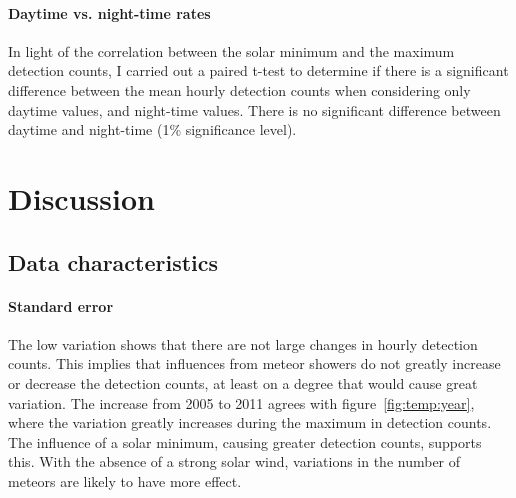 \paragraph{Daytime vs. night-time rates\\}
In light of the correlation between the solar minimum and the maximum detection counts, I carried out a paired t-test to determine if there is a significant difference between the mean hourly detection counts when considering only daytime values, and night-time values. There is no significant difference between daytime and night-time (1\% significance level).
\section{Discussion}
\subsection{Data characteristics}
\paragraph{Standard error\\}
The low variation shows that there are not large changes in hourly detection counts. This implies that influences from meteor showers do not greatly increase or decrease the detection counts, at least on a degree that would cause great variation. The increase from 2005 to 2011 agrees with figure~\ref{fig:temp:year}, where the variation greatly increases during the maximum in detection counts. The influence of a solar minimum, causing greater detection counts, supports this. With the absence of a strong solar wind, variations in the number of meteors are likely to have more effect.
